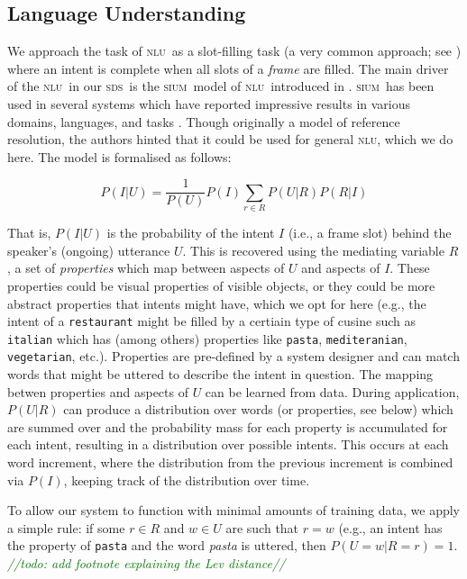 \documentclass[11pt]{article}
\newcommand{\todo}[1]{\textcolor{green}{\emph{//todo: #1//}}}
\newcommand{\sds}[0]{\textsc{sds}}
\newcommand{\nlu}[0]{\textsc{nlu}}
\newcommand{\sium}[0]{\textsc{sium}}
\begin{document}
\subsection{Language Understanding}

We approach the task of \nlu\ as a slot-filling task (a very common approach; see \cite{Tur2012}) where an intent is complete when all slots of a \emph{frame} are filled. The main driver of the \nlu\ in our \sds\ is the \sium\ model of \nlu\ introduced in \cite{Kennington2013a}. \sium\ has been used in several systems which have reported impressive results in various domains, languages, and tasks \cite{Kennington2014_coling,Kennington2015_naacl}. Though originally a model of reference resolution, the authors hinted that it could be used for general \nlu, which we do here. The model is formalised as follows:

\begin{center}
\begin{equation}
   P(I|U) = \frac{1}{P(U)} P(I)\sum_{r\in R} P(U|R)P(R|I) 
\label{eq:disc1}
\end{equation}
\end{center}

That is, $P(I|U)$ is the probability of the intent $I$ (i.e., a frame slot) behind the speaker's (ongoing) utterance $U$. This is recovered using the mediating variable $R$, a set of \emph{properties} which map between aspects of $U$ and aspects of $I$. These properties could be visual properties of visible objects, or they could be more abstract properties that intents might have, which we opt for here (e.g., the intent of a \texttt{restaurant} might be filled by a certiain type of cusine such as \texttt{italian} which has (among others) properties like \texttt{pasta}, \texttt{mediteranian}, \texttt{vegetarian}, etc.). Properties are pre-defined by a system designer and can match words that might be uttered to describe the intent in question. The mapping betwen properties and aspects of $U$ can be learned from data. During application, $P(U|R)$ can produce a distribution over words (or properties, see below) which are summed over and the probability mass for each property is accumulated for each intent, resulting in a distribution over possible intents. This occurs at each word increment, where the distribution from the previous increment is combined via $P(I)$, keeping track of the distribution over time. 

To allow our system to function with minimal amounts of training data, we apply a simple rule: if some $r \in R$ and $w \in U$ are such that $r=w$ (e.g., an intent has the property of \texttt{pasta} and the word \emph{pasta} is uttered, then $P(U=w|R=r) = 1$. \todo{add footnote explaining the Lev distance}
\end{document}
